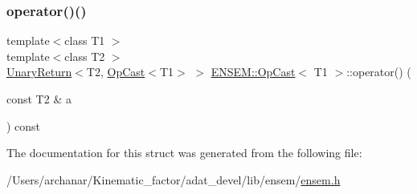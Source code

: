 \mbox{\label{structENSEM_1_1OpCast_a330c92c529ef7bba55e2b3cbbbf0c81a}} 
\subsubsection{\texorpdfstring{operator()()}{operator()()}\hspace{0.1cm}{\footnotesize\ttfamily [2/2]}}
{\footnotesize\ttfamily template$<$class T1 $>$ \\
template$<$class T2 $>$ \\
\mbox{\hyperlink{structENSEM_1_1UnaryReturn}{Unary\+Return}}$<$T2, \mbox{\hyperlink{structENSEM_1_1OpCast}{Op\+Cast}}$<$T1$>$ $>$ \mbox{\hyperlink{structENSEM_1_1OpCast}{E\+N\+S\+E\+M\+::\+Op\+Cast}}$<$ T1 $>$\+::operator() (\begin{DoxyParamCaption}\item[{const T2 \&}]{a }\end{DoxyParamCaption}) const\hspace{0.3cm}{\ttfamily [inline]}}



The documentation for this struct was generated from the following file\+:\begin{DoxyCompactItemize}
\item 
/\+Users/archanar/\+Kinematic\+\_\+factor/adat\+\_\+devel/lib/ensem/\mbox{\hyperlink{lib_2ensem_2ensem_8h}{ensem.\+h}}\end{DoxyCompactItemize}
